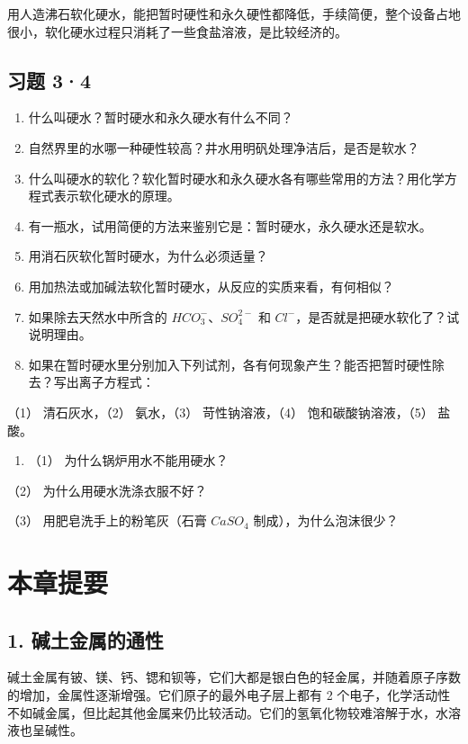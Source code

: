 用人造沸石软化硬水，能把暂时硬性和永久硬性都降低，手续简便，整个设备占地很小，软化硬水过程只消耗了一些食盐溶液，是比较经济的。

\subsection{习题 3·4}

\begin{enumerate}
\item
  什么叫硬水？暂时硬水和永久硬水有什么不同？
\item
  自然界里的水哪一种硬性较高？井水用明矾处理净洁后，是否是软水？
\item
  什么叫硬水的软化？软化暂时硬水和永久硬水各有哪些常用的方法？用化学方程式表示软化硬水的原理。
\item
  有一瓶水，试用简便的方法来鉴别它是：暂时硬水，永久硬水还是软水。
\item
  用消石灰软化暂时硬水，为什么必须适量？
\item
  用加热法或加碱法软化暂时硬水，从反应的实质来看，有何相似？
\item
  如果除去天然水中所含的 \(HCO_{3}^{-}\)、\(SO_{4}^{2-}\) 和
  \(Cl^{-}\)，是否就是把硬水软化了？试说明理由。
\item
  如果在暂时硬水里分别加入下列试剂，各有何现象产生？能否把暂时硬性除去？写出离子方程式：
\end{enumerate}

（1） 清石灰水，（2） 氨水，（3） 苛性钠溶液，（4）
饱和碳酸钠溶液，（5） 盐酸。

\begin{enumerate}[start=9]
\item
  （1） 为什么锅炉用水不能用硬水？
\end{enumerate}

（2） 为什么用硬水洗涤衣服不好？

（3） 用肥皂洗手上的粉笔灰（石膏 \(CaSO_{4}\) 制成），为什么泡沫很少？

\section{本章提要}

\subsection{1. 碱土金属的通性}

碱土金属有铍、镁、钙、锶和钡等，它们大都是银白色的轻金属，并随着原子序数的增加，金属性逐渐增强。它们原子的最外电子层上都有
2
个电子，化学活动性不如碱金属，但比起其他金属来仍比较活动。它们的氢氧化物较难溶解于水，水溶液也呈碱性。

